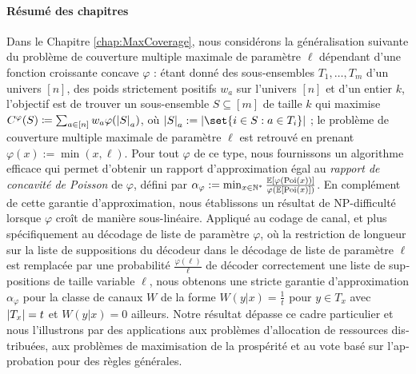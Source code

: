 \begin{otherlanguage}{french}
\paragraph{Résumé des chapitres} Dans le Chapitre \ref{chap:MaxCoverage}, nous considérons la généralisation suivante du problème de couverture multiple maximale de paramètre $\ell$ dépendant d'une fonction croissante concave $\varphi$ : étant donné des sous-ensembles $T_1, \ldots, T_m$ d'un univers $[n]$, des poids strictement positifs $w_a$ sur l'univers $[n]$ et d'un entier $k$, l'objectif est de trouver un sous-ensemble $S \subseteq [m]$ de taille $k$ qui maximise $C^{\varphi}(S) \coloneqq \sum_{a \in [n]}w_a\varphi(\abs{S}_a)$, où $\abs{S}_a : = \abs{\set{i \in S : a \in T_i}}$ ; le problème de couverture multiple maximale de paramètre $\ell$ est retrouvé en prenant $\varphi(x) := \min(x,\ell)$. Pour tout $\varphi$ de ce type, nous fournissons un algorithme efficace qui permet d'obtenir un rapport d'approximation égal au \emph{rapport de concavité de Poisson} de $\varphi$, défini par $\alpha_{\varphi} := \min_{x \in \mathbb{N}^*} \frac{\mathbb{E}[\varphi(\operatorname{\text{Poi}}(x))]}{\varphi(\mathbb{E}[\operatorname{\text{Poi}}(x)])}$. En complément de cette garantie d'approximation, nous établissons un résultat de \textrm{NP}-difficulté lorsque $\varphi$ croît de manière sous-linéaire. Appliqué au codage de canal, et plus spécifiquement au décodage de liste de paramètre $\varphi$, où la restriction de longueur sur la liste de suppositions du décodeur dans le décodage de liste de paramètre $\ell$ est remplacée par une probabilité $\frac{\varphi(\ell)}{\ell}$ de décoder correctement une liste de suppositions de taille variable $\ell$, nous obtenons une stricte garantie d'approximation $\alpha_{\varphi}$ pour la classe de canaux $W$ de la forme $W(y|x) = \frac{1}{t}$ pour $y \in T_x$ avec $\abs{T_x}=t$ et $W(y|x) = 0$ ailleurs. Notre résultat dépasse ce cadre particulier et nous l'illustrons par des applications aux problèmes d'allocation de ressources distribuées, aux problèmes de maximisation de la prospérité et au vote basé sur l'approbation pour des règles générales.


\end{otherlanguage}
